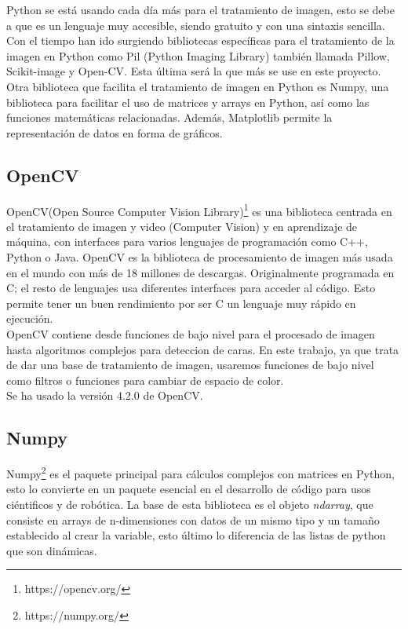 \documentclass[a4paper,12pt]{report}
\begin{document}
 Python se está usando cada día más para el tratamiento de imagen, esto se debe a que es un lenguaje muy accesible, siendo gratuito y con una sintaxis sencilla. Con el tiempo han ido surgiendo bibliotecas específicas para el tratamiento de la imagen en Python como Pil (Python Imaging Library) también llamada Pillow, Scikit-image y Open-CV. Esta última será la que más se use en este proyecto.\\

Otra biblioteca que facilita el tratamiento de imagen en Python es Numpy, una biblioteca para facilitar el uso de matrices y arrays en Python, así como las funciones matemáticas relacionadas.  Además, Matplotlib permite  la representación de datos en forma de gráficos.

\subsection{OpenCV}

OpenCV(Open Source Computer Vision Library)\footnote{https://opencv.org/} es una biblioteca centrada en el tratamiento de imagen y video (Computer Vision) y en aprendizaje de máquina, con interfaces para varios lenguajes de programación como C++, Python o Java. OpenCV es la biblioteca de procesamiento de imagen más usada en el mundo con más de 18 millones de descargas. Originalmente programada en C; el resto de lenguajes usa diferentes interfaces para acceder al código. Esto permite tener un buen rendimiento por ser C un lenguaje muy rápido en ejecución.\\

OpenCV contiene desde funciones de bajo nivel para el procesado de imagen hasta algoritmos complejos para deteccion de caras. En este trabajo, ya que trata de dar una base de tratamiento de imagen, usaremos funciones de bajo nivel como filtros o funciones para cambiar de espacio de color.\\

Se ha usado la versión 4.2.0 de OpenCV.\\


\subsection{Numpy}

Numpy\footnote{https://numpy.org/} es el paquete principal para cálculos complejos con matrices en Python, esto lo convierte en un paquete esencial en el desarrollo de código para usos ciéntificos y de robótica. La base de esta biblioteca es el objeto \emph{ndarray}, que consiste en arrays de n-dimensiones con datos de un mismo tipo y un tamaño establecido al crear la variable, esto último lo diferencia de las listas de python que son dinámicas.\\
\end{document}
